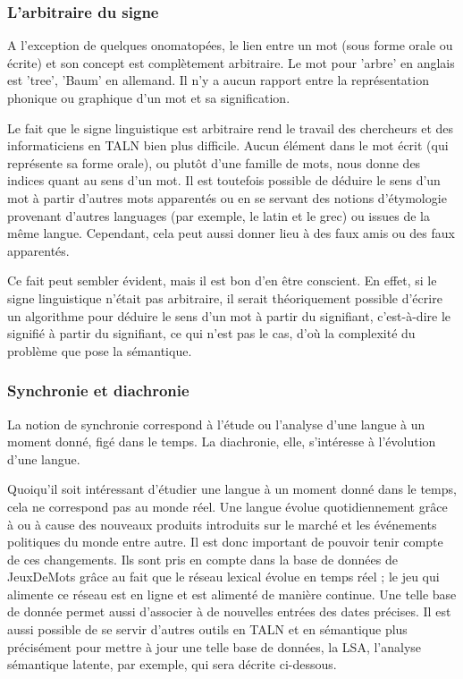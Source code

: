 \documentclass[a4paper,11pt,french]{article}
\begin{document}
\subsubsection{L'arbitraire du signe}

A l'exception de quelques onomatopées, le lien entre un mot (sous forme orale ou écrite) et son concept est complètement arbitraire. Le mot pour 'arbre' en anglais est 'tree', 'Baum' en allemand. Il n'y a aucun rapport entre la représentation phonique ou graphique d'un mot et sa signification.

Le fait que le signe linguistique est arbitraire rend le travail des chercheurs et des informaticiens en TALN bien plus difficile. Aucun élément dans le mot écrit (qui représente sa forme orale), ou plutôt d'une famille de mots, nous donne des indices quant au sens d'un mot. Il est toutefois possible de déduire le sens d'un mot à partir d'autres mots apparentés ou en se servant des notions d'étymologie provenant d'autres languages (par exemple, le latin et le grec) ou issues de la même langue. Cependant, cela peut aussi donner lieu à des faux amis ou des faux apparentés. 

Ce fait peut sembler évident, mais il est bon d'en être conscient. En effet, si le signe linguistique n'était pas arbitraire, il serait théoriquement possible d'écrire un algorithme pour déduire le sens d'un mot à partir du signifiant, c'est-à-dire le signifié à partir du signifiant, ce qui n'est pas le cas, d'où la complexité du problème que pose la sémantique. 


\subsubsection{Synchronie et diachronie}

La notion de synchronie correspond à l'étude ou l'analyse d'une langue à un moment donné, figé dans le temps. La diachronie, elle, s'intéresse à l'évolution d'une langue.

Quoiqu'il soit intéressant d'étudier une langue à un moment donné dans le temps, cela ne correspond pas au monde réel. Une langue évolue quotidiennement grâce à ou à cause des nouveaux produits introduits sur le marché et les événements politiques du monde entre autre. Il est donc important de pouvoir tenir compte de ces changements. Ils sont pris en compte dans la base de données de JeuxDeMots grâce au fait que le réseau lexical évolue en temps réel ; le jeu qui alimente ce réseau est en ligne et est alimenté de manière continue. Une telle base de donnée permet aussi d'associer à de nouvelles entrées des dates précises. Il est aussi possible de se servir d'autres outils en TALN et en sémantique plus précisément pour mettre à jour une telle base de données, la LSA, l'analyse sémantique latente, par exemple, qui sera décrite ci-dessous.
\end{document}
